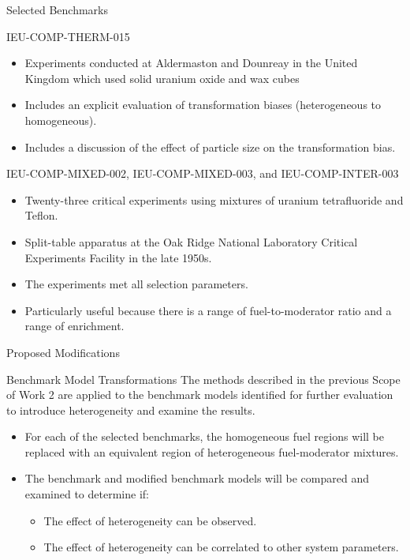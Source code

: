 \documentclass[10pt,aspectratio=169]{beamer}              %
\begin{document}
\begin{frame}{Selected Benchmarks}
    \begin{block}{IEU-COMP-THERM-015}
        \begin{itemize}
            \item Experiments conducted at Aldermaston and Dounreay in the United Kingdom which used solid uranium oxide and wax cubes
            \item Includes an explicit evaluation of transformation biases (heterogeneous to homogeneous).
            \item Includes a discussion of the effect of particle size on the transformation bias.
        \end{itemize}
    \end{block}
    \begin{block}{IEU-COMP-MIXED-002, IEU-COMP-MIXED-003, and IEU-COMP-INTER-003}
        \begin{itemize}
            \item Twenty-three critical experiments using mixtures of uranium tetrafluoride and Teflon.
            \item Split-table apparatus at the Oak Ridge National Laboratory Critical Experiments Facility in the late 1950s.
            \item The experiments met all selection parameters.
            \item Particularly useful because there is a range of fuel-to-moderator ratio and a range of enrichment.
        \end{itemize}
    \end{block}
\end{frame}

\begin{frame}{Proposed Modifications}
    \begin{block}{Benchmark Model Transformations}
        The methods described in the previous Scope of Work 2 are applied to the benchmark models identified for further evaluation to introduce heterogeneity and examine the results.
    \end{block}
    \begin{itemize}
        \item For each of the selected benchmarks, the homogeneous fuel regions will be replaced with an equivalent region of heterogeneous fuel-moderator mixtures.
        \item The benchmark and modified benchmark models will be compared and examined to determine if:
        \begin{itemize}
            \item The effect of heterogeneity can be observed.
            \item The effect of heterogeneity can be correlated to other system parameters.
        \end{itemize}
    \end{itemize}
\end{frame}
\end{document}
